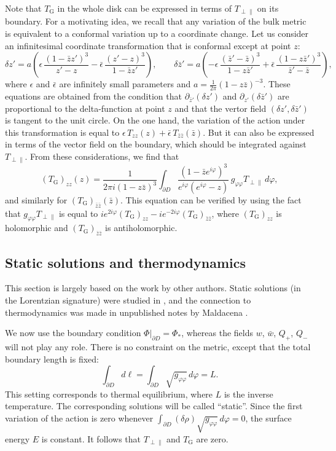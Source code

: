 \documentclass[12pt]{article}
\newcommand{\ph}{\varphi}
\newcommand{\Grav}{\mathrm{G}}
\begin{document}
Note that $T_{\Grav}$ in the whole disk can be expressed in terms of $T_{\perp\parallel}$ on its boundary. For a motivating idea, we recall that any variation of the bulk metric is equivalent to a conformal variation up to a coordinate change. Let us consider an infinitesimal coordinate transformation that is conformal except at point $z$:
\begin{equation}
\delta z'=a\left(
\epsilon\,\frac{(1-\bar{z}z')^3}{z'-z}
-\bar{\epsilon}\,\frac{(z'-z)^3}{1-\bar{z}z'}
\right),\qquad
\delta\bar{z}'=a\left(
-\epsilon\,\frac{(\bar{z}'-\bar{z})^3}{1-z\bar{z}'}
+\bar{\epsilon}\,\frac{(1-z\bar{z}')^3}{\bar{z}'-\bar{z}}
\right),
\end{equation}
where $\epsilon$ and $\bar{\epsilon}$ are infinitely small parameters and $a=\frac{1}{2\pi}(1-z\bar{z})^{-3}$. These equations are obtained from the condition that $\partial_{\bar{z}'}(\delta z')$ and $\partial_{z'}(\delta\bar{z}')$ are proportional to the delta-function at point $z$ and that the vertor field $(\delta z',\delta\bar{z}')$ is tangent to the unit circle. On the one hand, the variation of the action under this transformation is equal to $\epsilon\,T_{zz}(z) +\bar{\epsilon}\,T_{\bar{z}\bar{z}}(\bar{z})$. But it can also be expressed in terms of the vector field on the boundary, which should be integrated against $T_{\perp\parallel}$. From these considerations, we find that
\begin{equation}
(T_{\Grav})_{zz}(z)=\frac{1}{2\pi i(1-z\bar{z})^3}
\int_{\partial D}\frac{(1-\bar{z}e^{i\ph})^3}{e^{i\ph}(e^{i\ph}-z)}\,
g_{\ph\ph}T_{\perp\parallel}\,d\ph,
\end{equation}
and similarly for $(T_{\Grav})_{\bar{z}\bar{z}}(\bar{z})$. This equation can be verified by using the fact that $g_{\ph\ph}T_{\perp\parallel}$ is equal to $ie^{2i\ph}(T_{\Grav})_{zz} -ie^{-2i\ph}(T_{\Grav})_{\bar{z}\bar{z}}$, where $(T_{\Grav})_{zz}$ is holomorphic and $(T_{\Grav})_{\bar{z}\bar{z}}$ is antiholomorphic.

\subsection{Static solutions and thermodynamics}

This section is largely based on the work by other authors. Static solutions (in the Lorentzian signature) were studied in \cite{L-MKu94}, and the connection to thermodynamics was made in unpublished notes by Maldacena \cite{Mal16}.

We now use the boundary condition $\Phi|_{\partial D}=\Phi_*$, whereas the fields $w$, $\bar{w}$, $Q_+$, $Q_-$ will not play any role. There is no constraint on the metric, except that the total boundary length is fixed:
\begin{equation}
\int_{\partial D}d\ell=\int_{\partial D}\sqrt{g_{\ph\ph}}\,d\ph=L.
\end{equation}
This setting corresponds to thermal equilibrium, where $L$ is the inverse temperature. The corresponding solutions will be called ``static''. Since the first variation of the action is zero whenever $\int_{\partial D}(\delta\rho)\sqrt{g_{\ph\ph}}\,d\ph=0$, the surface energy $E$ is constant. It follows that $T_{\perp\parallel}$ and $T_{\Grav}$ are zero. 
\end{document}
